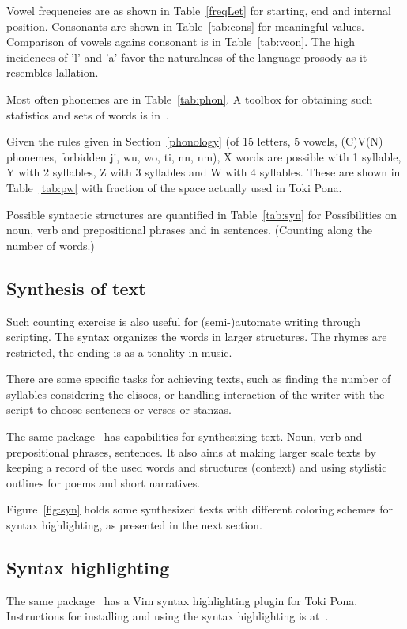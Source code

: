 \documentclass{article}
\begin{document}
Vowel frequencies are as shown in Table~\ref{freqLet}
for starting, end and internal position.
Consonants are shown in Table~\ref{tab:cons}
for meaningful values.
Comparison of vowels agains consonant is in Table~\ref{tab:vcon}.
The high incidences of 'l' and 'a' favor
the naturalness of the language prosody
as it resembles lallation.



Most often phonemes are in
Table~\ref{tab:phon}.
A toolbox for obtaining such statistics and sets
of words is in~\cite{tokipona}.

Given the rules given in Section~\ref{phonology}
(of 15 letters, 5 vowels, (C)V(N) phonemes,
forbidden ji, wu, wo, ti, nn, nm),
X words are possible with 1 syllable,
Y with 2 syllables, Z with 3 syllables
and W with 4 syllables.
These are shown in Table~\ref{tab:pw}
with fraction of the space actually used in Toki Pona.

Possible syntactic structures are quantified
in Table~\ref{tab:syn} for
Possibilities on noun, verb and prepositional phrases
and in sentences.
(Counting along the number of words.)


\subsection{Synthesis of text}
Such counting exercise is also useful
for (semi-)automate writing through scripting.
The syntax organizes the words in larger structures.
The rhymes are restricted,
the ending is as a tonality in music.

There are some specific tasks for achieving texts,
such as finding the number of syllables considering the elisoes,
or handling interaction of the writer with the script
to choose sentences or verses or stanzas.

The same package~\cite{tokipona}
has capabilities for synthesizing text.
Noun, verb and prepositional phrases,
sentences.
It also aims at making larger scale texts
by keeping a record of the used words and structures (context)
and using stylistic outlines for poems and short narratives.

Figure~\ref{fig:syn} holds some synthesized texts
with different coloring schemes for syntax highlighting,
as presented in the next section.

\subsection{Syntax highlighting}\label{shigh}
The same package~\cite{tokipona}
has a Vim syntax highlighting plugin
for Toki Pona.
Instructions for installing and using
the syntax highlighting is at~\cite{tokipona}.
\end{document}
